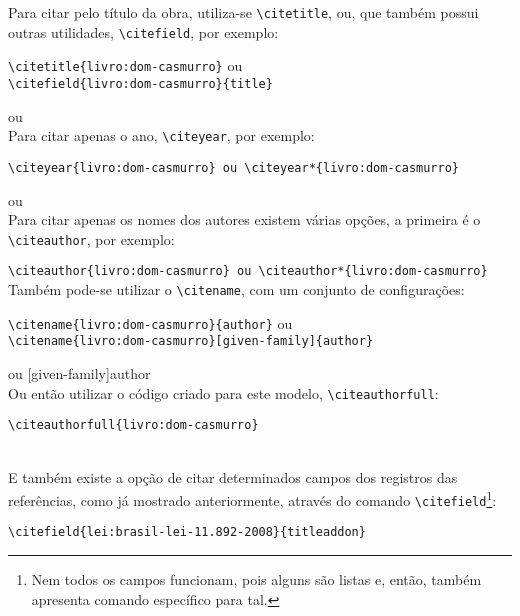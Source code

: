 Para citar pelo título da obra, utiliza-se \verb|\citetitle|, ou, que também possui outras utilidades, \verb|\citefield|, por exemplo: 

\verb|\citetitle{livro:dom-casmurro}| ou \\\verb|\citefield{livro:dom-casmurro}{title}|

 ou \\

Para citar apenas o ano, \verb|\citeyear|, por exemplo: 

\verb|\citeyear{livro:dom-casmurro} ou \citeyear*{livro:dom-casmurro}|

\citeyear{livro:dom-casmurro} ou \citeyear*{livro:dom-casmurro}\\

Para citar apenas os nomes dos autores existem várias opções, a primeira é o \verb|\citeauthor|, por exemplo: 

\verb|\citeauthor{livro:dom-casmurro} ou \citeauthor*{livro:dom-casmurro}|\\

Também pode-se utilizar o \verb|\citename|, com um conjunto de configurações: 

\verb|\citename{livro:dom-casmurro}{author}| ou \\\verb|\citename{livro:dom-casmurro}[given-family]{author}|

 ou [given-family]{author}\\

Ou então utilizar o código criado para este modelo, \verb|\citeauthorfull|\footnotemark:

\verb|\citeauthorfull{livro:dom-casmurro}|

\\

E também existe a opção de citar determinados campos dos registros das referências, como já mostrado anteriormente, através do comando \verb|\citefield|\footnote{Nem todos os campos funcionam, pois alguns são listas e, então, também apresenta comando específico para tal.}:

\verb|\citefield{lei:brasil-lei-11.892-2008}{titleaddon}|


